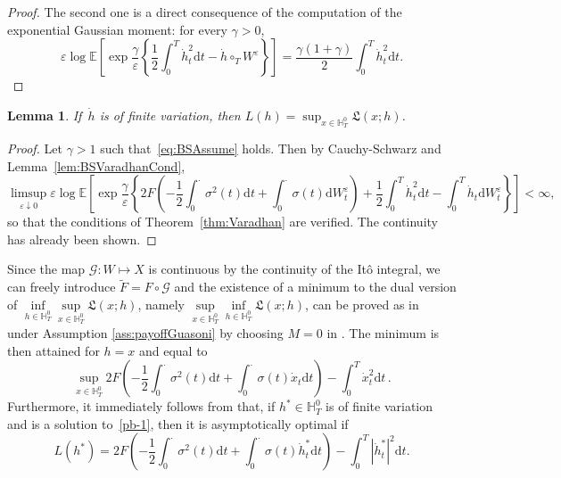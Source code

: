 \documentclass{amsart}[11pt]
\numberwithin{equation}{section}
\numberwithin{theorem}{subsection}
\numberwithin{proposition}{subsection}
\numberwithin{definition}{subsection}
\newtheorem{lemma}{Lemma}
\numberwithin{lemma}{subsection}
\numberwithin{assumption}{subsection}
\newcommand{\Gg}{\mathcal{G}}
\newcommand{\HH}{\mathbb{H}}
\newcommand{\Lf}{\mathfrak{L}}
\newcommand{\EE}{\mathbb{E}}
\newcommand{\cT}{\circ_{T}}
\newcommand{\D}{\mathrm{d}}
\newcommand{\eps}{\varepsilon}
\begin{document}
{\begin{proof}
The second one is a direct consequence of the computation of the exponential Gaussian moment: for every $\gamma >0$, 
$$
\eps  \log\EE\left[\exp\frac{\gamma}{\eps}\left\{\frac{1}{2}\int_0^T \dot{h}_t^2\D t
- \dot{h}\cT W^{\eps}\right\}\right]
= \frac{\gamma(1+\gamma)}{2}\int_0^T\dot{h}_t^2\D t.
$$
\end{proof}
\begin{lemma}
If~$\dot{h}$ is of finite variation, then 
$L(h) = \sup_{x \in \HH_T^0}\Lf(x;h)$.
\end{lemma}
\begin{proof}
Let $\gamma>1$ such that~\eqref{eq:BSAssume} holds. Then by Cauchy-Schwarz and Lemma~\ref{lem:BSVaradhanCond},
$$
\limsup\limits_{\eps\downarrow 0} \eps \log\EE\left[\exp\frac{\gamma}{\eps}\left\{2F\left(-\frac{1}{2}\int_{0}^{\cdot} \sigma^2(t)\D t + \int_{0}^{\cdot} \sigma(t) \D W_t^\eps\right) + \frac{1}{2}\int_0^T \dot{h}_t^2\D t - \int_0^T \dot{h}_t \D W_t^{\eps} \right\}\right] <\infty,
$$
so that the conditions of Theorem~\ref{thm:Varadhan} are verified.
The continuity has already been shown.
\end{proof}
Since the map $\Gg: W\mapsto X$ is continuous by the continuity of the It\^{o} integral, we can freely introduce $\widetilde F = F\circ\Gg$ and the existence of a minimum to the dual version of 
$\inf\limits_{h \in \HH_T^0} \sup\limits_{x \in \HH_T^0} \Lf(x;h)$,
namely $\sup\limits_{x \in \HH_T^0} \inf\limits_{h \in \HH_T^0}\Lf(x;h)$,
can be proved as in~\cite{Guasoni2007} under Assumption \ref{ass:payoffGuasoni} by choosing $M=0$ in \cite[Lemma~7.1]{Guasoni2007}. 
The minimum is then attained  for $h=x$ and equal to 
\begin{equation}\label{pb-1}
    \sup\limits_{x \in \HH_T^0}2F\left(-\frac{1}{2}\int_{0}^{\cdot} \sigma^2(t)\D t + \int_{0}^{\cdot} \sigma(t) \dot{x}_t \D t\right)
 - \int_0^T \dot{x}_t^2 \D t\,.
\end{equation}
Furthermore, it immediately follows from \cite[Theorem~3.6]{Guasoni2007} that, if $h^*\in \HH_T^0$ is of finite variation and is a solution to~\eqref{pb-1}, then it is asymptotically optimal if
$$
L(h^{*}) = 2F\left(-\frac{1}{2}\int_{0}^{\cdot} \sigma^2(t)\D t + \int_{0}^{\cdot} \sigma(t) \dot{h}^{*}_t \D t\right) - \int_0^T |\dot{h}^{*}_t|^2 \D t.
$$

}
\end{document}
